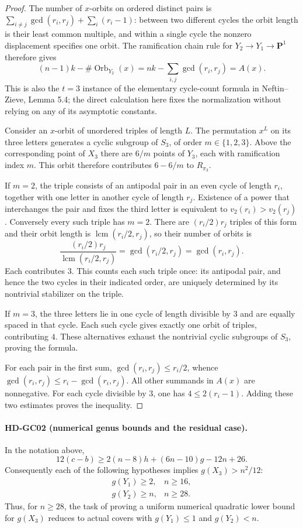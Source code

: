 \begin{proof}
The number of $x$-orbits on ordered distinct pairs is
$\sum_{i\ne j}\gcd(r_i,r_j)+\sum_i(r_i-1)$: between two different
cycles the orbit length is their least common multiple, and within a
single cycle the nonzero displacement specifies one orbit. The
ramification chain rule for $Y_2\to Y_1\to\mathbf P^1$ therefore gives
\[
 (n-1)k-\#\operatorname{Orb}_{Y_2}(x)
 =nk-\sum_{i,j}\gcd(r_i,r_j)=A(x).
\]
This is also the $t=3$ instance of the elementary cycle-count formula
in Neftin--Zieve, Lemma 5.4; the direct calculation here fixes the
normalization without relying on any of its asymptotic constants.

Consider an $x$-orbit of unordered triples of length $L$. The
permutation $x^L$ on its three letters generates a cyclic subgroup of
$S_3$, of order $m\in\{1,2,3\}$. Above the corresponding point of
$X_3$ there are $6/m$ points of $Y_3$, each with ramification index
$m$. This orbit therefore contributes $6-6/m$ to $R_{\pi_3}$.

If $m=2$, the triple consists of an antipodal pair in an even cycle of
length $r_i$, together with one letter in another cycle of length
$r_j$. Existence of a power that interchanges the pair and fixes the
third letter is equivalent to $v_2(r_i)>v_2(r_j)$. Conversely every
such triple has $m=2$. There are $(r_i/2)r_j$ triples of this form and
their orbit length is $\operatorname{lcm}(r_i/2,r_j)$, so their number
of orbits is
\[
 \frac{(r_i/2)r_j}{\operatorname{lcm}(r_i/2,r_j)}
 =\gcd(r_i/2,r_j)=\gcd(r_i,r_j).
\]
Each contributes $3$. This counts each such triple once: its
antipodal pair, and hence the two cycles in their indicated order,
are uniquely determined by its nontrivial stabilizer on the triple.

If $m=3$, the three letters lie in one cycle of length divisible by
$3$ and are equally spaced in that cycle. Each such cycle gives
exactly one orbit of triples, contributing $4$. These alternatives
exhaust the nontrivial cyclic subgroups of $S_3$, proving the formula.

For each pair in the first sum, $\gcd(r_i,r_j)\leq r_i/2$, whence
$\gcd(r_i,r_j)\leq r_i-\gcd(r_i,r_j)$. All other summands in $A(x)$
are nonnegative. For each cycle divisible by $3$, one has
$4\leq2(r_i-1)$. Adding these two estimates proves the inequality.
\end{proof}

\paragraph{HD-GC02 (numerical genus bounds and the residual case).}
In the notation above,
\[
 12(c-b)\geq
 2(n-8)h+(6n-10)g-12n+26.                         \tag{GC1}
\]
Consequently each of the following hypotheses implies
$g(X_3)>n^2/12$:
\[
 \begin{array}{ll}
  g(Y_1)\geq2,& n\geq16,\\
  g(Y_2)\geq n,& n\geq28.
 \end{array}                                      \tag{GC2}
\]
Thus, for $n\geq28$, the task of proving a uniform numerical
quadratic lower bound for $g(X_3)$ reduces to actual covers with
$g(Y_1)\leq1$ and $g(Y_2)<n$.

